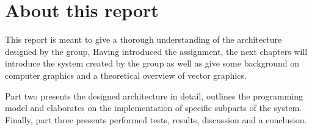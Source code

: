 \section{About this report}

This report is meant to give a thorough understanding of the architecture designed by the group,
Having introduced the assignment, the next chapters will introduce the system created by the group as well as give some background on computer graphics and a theoretical overview of vector graphics.


Part two presents the designed architecture in detail, outlines the programming model and elaborates on the implementation of specific subparts of the system.
Finally, part three presents performed tests, results, discussion and a conclusion.

